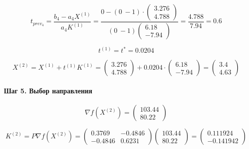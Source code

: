 \begin{equation*}
	t_{prev_4} = \frac{b_4 - a_4 X^{(1)}}{a_4 K^{(1)}} = \frac{0 - (0\ -1) \cdot \begin{pmatrix} 3.276 \\ 4.788 \end{pmatrix}}{(0\ -1) \begin{pmatrix} 6.18 \\ -7.94 \end{pmatrix}} = \frac{4.788}{7.94} = 0.6
\end{equation*}

\begin{equation*}
	t^{(1)} = t^* = 0.0204
\end{equation*}

\begin{equation*}
	X^{(2)} = X^{(1)} + t^{(1)} K^{(1)} = \begin{pmatrix}
		3.276 \\ 4.788
	\end{pmatrix}
	+
	0.0204 \cdot \begin{pmatrix} 6.18 \\ -7.94 \end{pmatrix}
	=
	\begin{pmatrix}
		3.4 \\ 4.63
	\end{pmatrix}
\end{equation*}

\paragraph{Шаг 5. Выбор направления}

\begin{equation*} 
	\nabla f(X^{(2)}) = \begin{pmatrix} 
		103.44
		\\ 
		80.22
	\end{pmatrix}
\end{equation*}

\begin{equation*}
	K^{(2)} = P \nabla f(X^{(2)}) = \begin{pmatrix} 
		0.3769 & -0.4846 
		\\ 
		-0.4846  & 0.6231 
	\end{pmatrix}
	\begin{pmatrix} 
		103.44
		\\ 
		80.22
	\end{pmatrix}
	=
	\begin{pmatrix} 
		0.111924 \\-0.141942
	\end{pmatrix}
\end{equation*}

